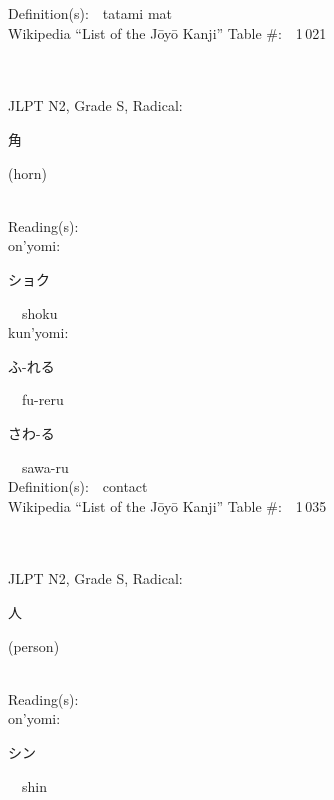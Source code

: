 \begin{multicols}{2}
Definition(s):\ \ tatami mat \\
Wikipedia ``List of the J\=oy\=o Kanji'' Table \#:\ \ 1\,021 \\
\ \ \\
{\fontsize{34pt}{40pt}  }\ \ \\  %
{JLPT N2, Grade S, Radical:\ \ {\begin{CJK}{UTF8}{min} 角 \end{CJK}} (horn) } \\
Reading(s):\ \ \\
{\hspace*{1em}}on'yomi:\ \ \\
{\hspace*{2em}}{\begin{CJK}{UTF8}{min} ショク \end{CJK}}\ \ shoku\ \ \\
{\hspace*{1em}}kun'yomi:\ \ \\
{\hspace*{2em}}{\begin{CJK}{UTF8}{min} ふ-れる \end{CJK}}\ \ fu-reru\ \ \\
{\hspace*{2em}}{\begin{CJK}{UTF8}{min} さわ-る \end{CJK}}\ \ sawa-ru\ \ \\
Definition(s):\ \ contact \\
Wikipedia ``List of the J\=oy\=o Kanji'' Table \#:\ \ 1\,035 \\
\ \ \\
{\fontsize{34pt}{40pt}  }\ \ \\  %
{JLPT N2, Grade S, Radical:\ \ {\begin{CJK}{UTF8}{min} 人 \end{CJK}} (person) } \\
Reading(s):\ \ \\
{\hspace*{1em}}on'yomi:\ \ \\
{\hspace*{2em}}{\begin{CJK}{UTF8}{min} シン \end{CJK}}\ \ shin\ \ \\

\end{multicols}
